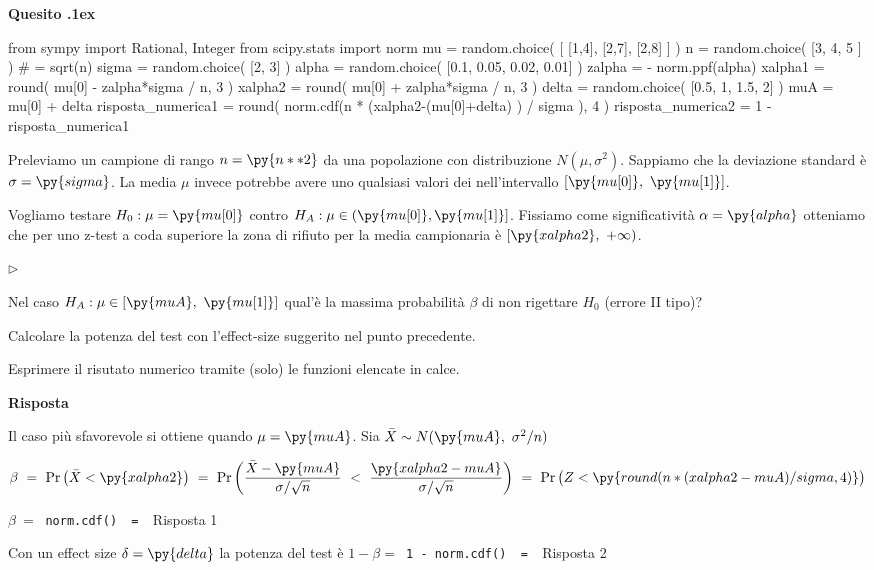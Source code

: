\documentclass[11pt,twoside,a4paper]{article}
\newcommand{\mylabel}[1]{#1\hfill}
\renewenvironment{itemize}
  {\begin{list}{$\triangleright$}{%
   \setlength{\parskip}{0mm}
   \setlength{\topsep}{.4\baselineskip}
   \setlength{\rightmargin}{0mm}
   \setlength{\listparindent}{0mm}
   \setlength{\itemindent}{0mm}
   \setlength{\labelwidth}{2ex}
   \setlength{\itemsep}{.4\baselineskip}
   \setlength{\parsep}{0mm}
   \setlength{\partopsep}{0mm}
   \setlength{\labelsep}{1ex}
   \setlength{\leftmargin}{\labelwidth+\labelsep}
   \let\makelabel\mylabel}}{%
   \end{list}\vspace*{-1.3mm}}
\def\Pr{{\rm Pr\,}}
\newcounter{quesito}
\newenvironment{question}{\bigskip\addtocounter{quesito}{1}\par\textbf{Quesito \thequesito.\kern1ex}}{\vspace{\parskip}}
\newenvironment{answer}{\par\textbf{Risposta\quad}}{\vspace{\parskip}}
\begin{document}
\begin{question} 
\begin{pycode}
from sympy import Rational, Integer
from scipy.stats import norm
mu = random.choice( [ [1,4], [2,7], [2,8] ] )
n = random.choice( [3, 4, 5 ] ) # = sqrt(n)
sigma = random.choice( [2, 3] )
alpha = random.choice( [0.1, 0.05, 0.02, 0.01] )
zalpha = - norm.ppf(alpha) 
xalpha1 = round( mu[0] - zalpha*sigma / n, 3 )
xalpha2 = round( mu[0] + zalpha*sigma / n, 3 )
delta = random.choice( [0.5, 1, 1.5, 2] )
muA = mu[0] + delta
risposta_numerica1 = round( norm.cdf(n * (xalpha2-(mu[0]+delta) ) / sigma ), 4 )
risposta_numerica2 = 1 - risposta_numerica1
\end{pycode}
Preleviamo un campione di rango $n=\py{n**2}$ da una popolazione con distribuzione $N(\mu,\sigma^2)$. Sappiamo che la deviazione standard è $\sigma=\py{sigma}$. La media $\mu$ invece potrebbe avere uno qualsiasi valori dei nell'intervallo $[\py{mu[0]},\ \py{mu[1]}  ]$.

Vogliamo testare $H_0:\mu=\py{mu[0]}$ contro $H_A:\mu\in (\py{mu[0]},\py{mu[1]}]$. Fissiamo come significatività $\alpha=\py{alpha}$ otteniamo che per uno z-test a coda superiore la zona di rifiuto per la media campionaria è $[\py{xalpha2}, \ +\infty)$.

\begin{itemize}
\item[1.] Nel caso $H_A:\mu\in [\py{muA},\ \py{mu[1]}]$ qual'è la massima probabilità $\beta$ di non rigettare $H_0$ (errore II tipo)?
\item[2.] Calcolare la potenza del test con l'effect-size suggerito nel punto precedente.
\end{itemize}

Esprimere il risutato numerico tramite (solo) le funzioni elencate in calce.

\begin{answer}

Il caso più sfavorevole si ottiene quando $\mu = \py{muA}$. Sia $\bar X\sim N(\py{muA},\ \sigma^2/n)$

$\beta
\ =\ 
\Pr\big(\bar X < \py{xalpha2} \big)
\ =\ 
\Pr\bigg( \dfrac{\bar X - \py{muA} }{\sigma/\sqrt{n}}\ <\ \dfrac{\py{xalpha2-muA} }{\sigma/\sqrt{n} }\bigg)
\ =\ 
\Pr\big( Z<  \py{round( n * (xalpha2-muA ) / sigma, 4) }\big)$


{\color{blue}$\beta
\ =\ $}
{\color{blue}\tt norm.cdf() }{\tt\ =\  }{\color{blue}\hfill Risposta 1}

\medskip
Con un effect size $\delta=\py{delta}$ la potenza del test è $1-\beta=${\color{blue}\tt\ 1 - norm.cdf() }{\tt\ =\  }{\color{blue}\hfill Risposta 2}

\end{answer}
\end{question}
\end{document}
